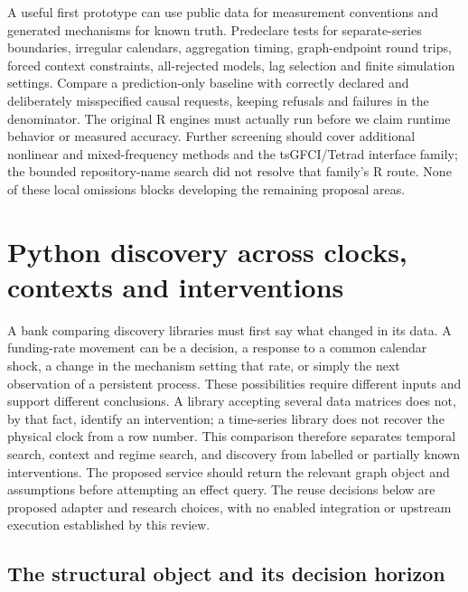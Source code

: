 A useful first prototype can use public data for measurement conventions and
generated mechanisms for known truth. Predeclare tests for separate-series
boundaries, irregular calendars, aggregation timing, graph-endpoint round trips,
forced context constraints, all-rejected models, lag selection and finite
simulation settings. Compare a prediction-only baseline with correctly declared
and deliberately misspecified causal requests, keeping refusals and failures in
the denominator. The original R engines must actually run before we claim
runtime behavior or measured accuracy. Further screening should cover additional
nonlinear and mixed-frequency methods and the tsGFCI/Tetrad interface family;
the bounded repository-name search did not resolve that family's R route.
None of these local omissions blocks developing the remaining proposal areas.
\citep{exec14_rtime_contract}
\label{exec14:r-temporal-end}


\section{Python discovery across clocks, contexts and interventions}
\label{exec14:python-temporal}

A bank comparing discovery libraries must first say what changed in its data.
A funding-rate movement can be a decision, a response to a common calendar
shock, a change in the mechanism setting that rate, or simply the next
observation of a persistent process. These possibilities require different
inputs and support different conclusions. A library accepting several data
matrices does not, by that fact, identify an intervention; a time-series
library does not recover the physical clock from a row number. This comparison
therefore separates temporal search, context and regime search, and discovery
from labelled or partially known interventions. The proposed service should
return the relevant graph object and assumptions before attempting an effect
query. The reuse decisions below are proposed adapter and research choices,
with no enabled integration or upstream execution established by this review.
\citep{exec14_pt_contract}

\subsection{The structural object and its decision horizon}

